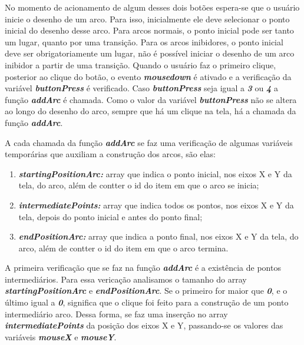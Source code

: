 \documentclass[
	12pt,				%
	openright,			%
	oneside,			%
	a4paper,			%
	english,			%
	brazil				%
	]{abntex2}
\begin{document}


No momento de acionamento de algum desses dois botões espera-se que o usuário inicie o desenho de um arco. Para isso, inicialmente ele deve selecionar o ponto inicial do desenho desse arco. Para arcos normais, o ponto inicial pode ser tanto um lugar, quanto por uma transição. Para os arcos inibidores, o ponto inicial deve ser obrigatoriamente um lugar, não é possível iniciar o desenho de um arco inibidor a partir de uma transição. Quando o usuário faz o primeiro clique, posterior ao clique do botão, o evento \textbf{\textit{mousedown}} é ativado e a verificação da variável \textbf{\textit{buttonPress}} é verificado. Caso \textbf{\textit{buttonPress}} seja igual a \textbf{\textit{3}} ou \textbf{\textit{4}} a função \textbf{\textit{addArc}} é chamada. Como o valor da variável \textbf{\textit{buttonPress}} não se altera ao longo do desenho do arco, sempre que há um clique na tela, há a chamada da função \textbf{\textit{addArc}}.

A cada chamada da função \textbf{\textit{addArc}} se faz uma verificação de algumas variáveis temporárias que auxiliam a construção dos arcos, são elas: 

\begin{enumerate}
	\item \textbf{\textit{startingPositionArc:}} array que indica o ponto inicial, nos eixos X e Y da tela, do arco, além de contter o id do item em que o arco se inicia;
	\item \textbf{\textit{intermediatePoints:}} array que indica todos os pontos, nos eixos X e Y da tela, depois do ponto inicial e antes do ponto final;
	\item \textbf{\textit{endPositionArc:}} array que indica a ponto final, nos eixos X e Y da tela, do arco, além de contter o id do item em que o arco termina.
\end{enumerate}

A primeira verificação que se faz na função \textbf{\textit{addArc}} é a existência de pontos intermediários. Para essa vericação analisamos o tamanho do array \textbf{\textit{startingPositionArc}} e \textbf{\textit{endPositionArc}}. Se o primeiro for maior que \textbf{\textit{0}}, e o último igual a \textit{\textbf{0}}, significa que o clique foi feito para a construção de um ponto intermediário  arco. Dessa forma, se faz uma inserção no array \textbf{\textit{intermediatePoints}} da posição dos eixos X e Y, passando-se os valores das variáveis \textbf{\textit{mouseX}} e \textbf{\textit{mouseY}}.
\end{document}
